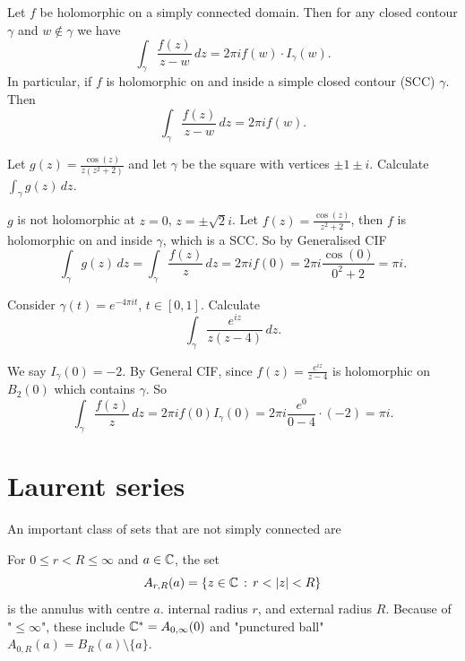 \documentclass[10pt, a4paper]{article}
\begin{document}
\begin{corollary}
    Let $f$ be holomorphic on a simply connected domain.
    Then for any closed contour $\gamma$ and $w \notin \gamma$ we have
    \[
    \int_{\gamma}\frac{f(z)}{z - w}\,dz = 2\pi if(w)\cdot I_{\gamma}(w).
    \]
    In particular,
    if $f$ is holomorphic on and inside a simple closed contour
    (SCC)
    $\gamma$.
    Then
    \[
    \int_{\gamma}\frac{f(z)}{z - w}\,dz = 2\pi if(w).
    \]
\end{corollary}

\begin{example}
    Let $g(z) = \frac{\cos(z)}{z(z ^ 2 + 2)}$ and let $\gamma$ be the square with vertices $\pm 1 \pm i$.
    Calculate $\int_{\gamma}g(z)\,dz$.

    \begin{solution}
        $g$ is not holomorphic at $z = 0$,
        $z = \pm\sqrt{2}i$.
        Let $f(z) = \frac{\cos(z)}{z ^ 2 + 2}$,
        then $f$ is holomorphic on and inside $\gamma$,
        which is a SCC.
        So by Generalised CIF
        \[
        \int_{\gamma}g(z)\,dz = \int_{\gamma}\frac{f(z)}{z}\,dz = 2\pi if(0) = 2\pi i\frac{\cos(0)}{0 ^ 2 + 2} = \pi i.
        \]
    \end{solution}

    Consider $\gamma(t) = e ^ {-4\pi it}$,
    $t \in [0, 1]$.
    Calculate
    \[
    \int_{\gamma}\frac{e ^ {iz}}{z(z - 4)}\,dz.
    \]

    \begin{solution}
        We say $I_{\gamma}(0) = -2$.
        By General CIF,
        since $f(z) = \frac{e ^ {iz}}{z - 4}$ is holomorphic on $B_2(0)$ which contains $\gamma$.
        So
        \[
        \int_{\gamma}\frac{f(z)}{z}\,dz = 2\pi if(0)I_{\gamma}(0) = 2\pi i\frac{e ^ 0}{0 - 4} \cdot (-2) = \pi i.
        \]
    \end{solution}
\end{example}

\newpage

\section{Laurent series}
An important class of sets that are not simply connected are

\begin{definition}[Annulus]
    For $0 \leq r < R \leq \infty$ and $a \in \mathbb{C}$,
    the set
    \[
    A_{r, R}(a) = \{z \in \mathbb{C}\,:\, r < |z| < R\}
    \]
    is the annulus with centre $a$.
    internal radius $r$,
    and external radius $R$.
    Because of "$\leq \infty$",
    these include $\mathbb{C} ^ {*} = A_{0, \infty}(0)$ and "punctured ball" $A_{0, R}(a) = B_R(a)\setminus \{a\}$.
\end{definition}
\end{document}
